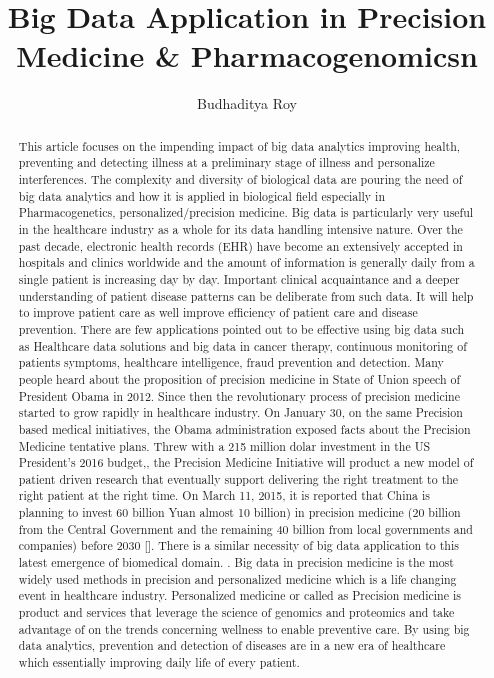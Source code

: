 \documentclass[sigconf]{acmart}
\begin{document}
\title{Big Data Application in Precision Medicine & Pharmacogenomicsn}


\author{Budhaditya Roy}

\renewcommand{\shortauthors}{B.Roy.}


\begin{abstract}
This article focuses on the impending impact of big data analytics improving health, preventing and detecting illness at a preliminary stage of illness and personalize interferences. The complexity and diversity of biological data are pouring the need of big data analytics and how it is applied in biological field especially in Pharmacogenetics, personalized/precision medicine. Big data is particularly very useful in the healthcare industry as a whole for its data handling intensive nature. Over the past decade, electronic health records (EHR) have become an extensively accepted in hospitals and clinics worldwide and the amount of information is generally daily from a single patient is increasing day by day. Important clinical acquaintance and a deeper understanding of patient disease patterns can be deliberate from such data. It will help to improve patient care as well improve efficiency of patient care and disease prevention. There are few applications pointed out to be effective using big data such as Healthcare data solutions and big data in cancer therapy, continuous monitoring of patients symptoms, healthcare intelligence, fraud prevention and detection. Many people heard about the proposition of precision medicine in State of Union speech of President Obama in 2012. Since then the revolutionary process of precision medicine started to grow rapidly in healthcare industry. On January 30, on the same Precision based medical initiatives, the Obama administration exposed facts about the Precision Medicine tentative plans. Threw with a 215 million dolar investment in the US President’s 2016 budget,, the Precision Medicine Initiative will product a new model of patient driven research that eventually support delivering the right treatment to the right patient at the right time\cite{editor01}. On March 11, 2015, it is reported that China is planning to invest 60 billion Yuan almost 10 billion) in precision medicine (20 billion from the Central Government and the remaining 40 billion from local governments and companies) before 2030 [\cite{editor01}]. There is a similar necessity of big data application to this latest emergence of biomedical domain. . Big data in precision medicine is the most widely used methods in precision and personalized medicine which is a life changing event in healthcare industry. Personalized medicine or called as Precision medicine is product and services that leverage the science of genomics and proteomics and take advantage of on the trends concerning wellness to enable preventive care. By using big data analytics, prevention and detection of diseases are in a new era of healthcare which essentially improving daily life of every patient. 
\end{abstract}
\end{document}
